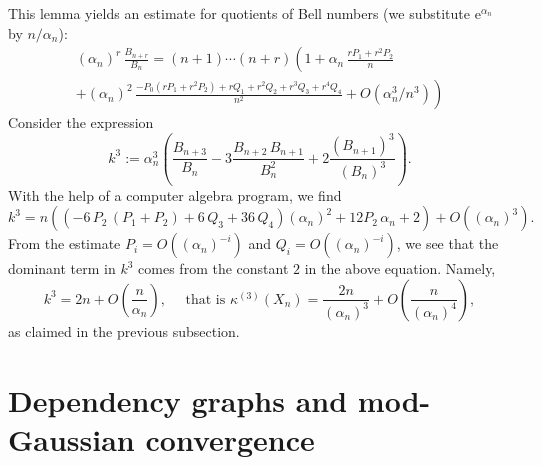 \documentclass[12pt,a4paper,reqno]{amsart}
\theoremstyle{remark}
\newcommand{\E}{\mathrm{e}}
\begin{document}
This lemma yields an estimate for quotients of Bell numbers (we substitute $\E^{\alpha_n}$ by $n/\alpha_n$):
\begin{multline*}
    (\alpha_n)^r \, \frac{B_{n+r}}{B_n}=(n+1) \cdots (n+r) \left( 
1+\alpha_n \, \frac{rP_1+r^2P_2}{n} \right.\\
\left.+(\alpha_n)^2 \, \frac{-P_0 (rP_1+r^2P_2)+rQ_1+r^2Q_2+r^3Q_3+r^4Q_4}{n^2} +O(\alpha_n^3/n^3)\right)
\end{multline*}
Consider the expression 
\[k^3:=\alpha_n^3 \left(\frac{B_{n+3}}{B_n} -3 \frac{B_{n+2}\, B_{n+1}}{B_n^2} +2 \frac{(B_{n+1})^3}{(B_n)^3} \right).\]
With the help of a computer algebra program, we find
\[k^3 = n \left( (-6 \, P_2\, (P_1+P_2) + 6 \, Q_3 + 36 \, Q_4 ) (\alpha_n)^2 + 12 P_2\, \alpha_n + 2\right) +O((\alpha_n)^3).\]
From the estimate $P_i=O((\alpha_n)^{-i})$ and $Q_i=O((\alpha_n)^{-i})$, we see that the dominant term in $k^3$ comes 
from the constant $2$ in the above equation. Namely,
\[k^3= 2 n + O\!\left(\frac{n}{\alpha_n}\right), \quad\text{ that is }\kappa^{(3)}(X_n)= \frac{2n}{(\alpha_n)^3} + O\!\left(\frac{n}{(\alpha_n)^4}\right),\]
as claimed in the previous subsection.
\bigskip
\bigskip
















\section{Dependency graphs and mod-Gaussian convergence}\label{sec:depgraph}
\end{document}

